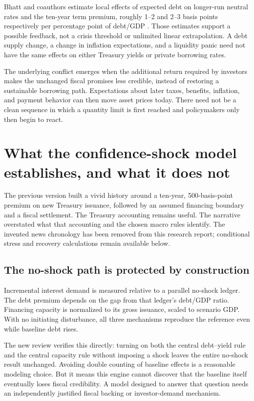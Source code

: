 \documentclass[11pt]{article}
\begin{document}
Bhatt and coauthors estimate local effects of expected debt on longer-run neutral rates
and the ten-year term premium, roughly 1--2 and 2--3 basis points respectively per
percentage point of debt/GDP \cite{fedDebtRates}. Those estimates support a possible feedback,
not a crisis threshold or unlimited linear extrapolation. A debt supply change, a change
in inflation expectations, and a liquidity panic need not have the same effects on either
Treasury yields or private borrowing rates.

The underlying conflict emerges when the additional return required by investors makes
the unchanged fiscal promises less credible, instead of restoring a sustainable borrowing
path. Expectations about later taxes, benefits, inflation, and payment behavior can then
move asset prices today. There need not be a clean sequence in which a quantity limit is
first reached and policymakers only then begin to react.

\section{What the confidence-shock model establishes, and what it does not}

The previous version built a vivid history around a ten-year, 500-basis-point premium on
new Treasury issuance, followed by an assumed financing boundary and a fiscal settlement.
The Treasury accounting remains useful. The narrative overstated what that accounting and
the chosen macro rules identify. The invented news chronology has been removed from this
research report; conditional stress and recovery calculations remain available below.

\subsection*{The no-shock path is protected by construction}

Incremental interest demand is measured relative to a parallel no-shock ledger. The debt
premium depends on the gap from that ledger's debt/GDP ratio. Financing capacity is
normalized to its gross issuance, scaled to scenario GDP. With no initiating disturbance,
all three mechanisms reproduce the reference even while baseline debt rises.

The new review verifies this directly: turning on both the central debt--yield rule and
the central capacity rule without imposing a shock leaves the entire no-shock result
unchanged. Avoiding double counting of baseline effects is a reasonable modeling choice.
But it means this engine cannot discover that the baseline itself eventually loses fiscal
credibility. A model designed to answer that question needs an independently justified
fiscal backing or investor-demand mechanism.
\end{document}
